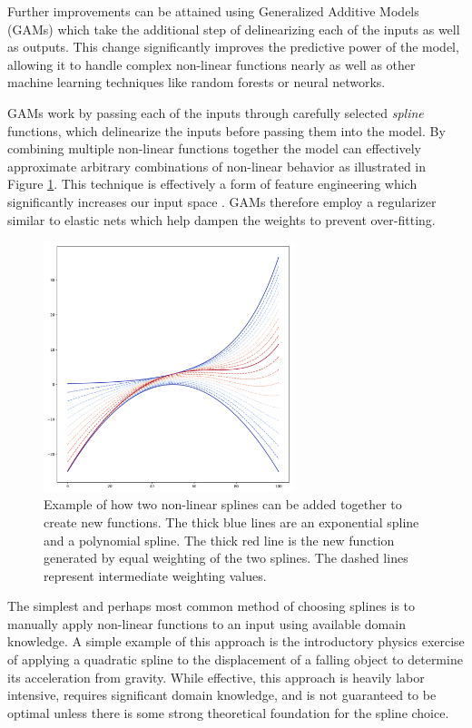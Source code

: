Further improvements can be attained using Generalized Additive Models (GAMs) \citep{Hastie2007GeneralizedModels} which take the additional step of delinearizing each of the inputs as well as outputs. This change significantly improves the predictive power of the model, allowing it to handle complex non-linear functions nearly as well as other machine learning techniques like random forests or neural networks. 

GAMs work by passing each of the inputs through carefully selected \textit{spline} functions, which delinearize the inputs before passing them into the model. By combining multiple non-linear functions together the model can effectively approximate arbitrary combinations of non-linear behavior as illustrated in Figure \ref{fig:fancy_spline}. This technique is effectively a form of feature engineering which significantly increases our input space \citep{Molnar2019InterpretableLearning}. GAMs therefore employ a regularizer similar to elastic nets which help dampen the weights to prevent over-fitting.

\begin{figure}[t]
    \centering
    \includegraphics[width=0.65\textwidth]{fig/spline}
    \caption{Example of how two non-linear splines can be added together to create new functions. The thick blue lines are an exponential spline and a polynomial spline. The thick red line is the new function generated by equal weighting of the two splines. The dashed lines represent intermediate weighting values.}
    \label{fig:fancy_spline}
\end{figure}

The simplest and perhaps most common method of choosing splines is to manually apply non-linear functions to an input using available domain knowledge. A simple example of this approach is the introductory physics exercise of applying a quadratic spline to the displacement of a falling object to determine its acceleration from gravity. While effective, this approach is heavily labor intensive, requires significant domain knowledge, and is not guaranteed to be optimal unless there is some strong theoretical foundation for the spline choice. 

